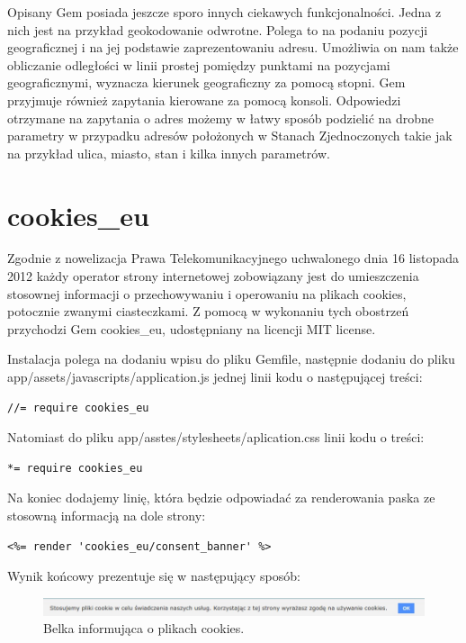 \documentclass[openright]{xmgr}
\begin{document}
Opisany Gem posiada jeszcze sporo innych ciekawych funkcjonalności. Jedna z nich jest na przykład geokodowanie odwrotne. Polega to na podaniu pozycji geograficznej i na jej podstawie zaprezentowaniu adresu. Umożliwia on nam także obliczanie odległości w linii prostej pomiędzy punktami na pozycjami geograficznymi, wyznacza kierunek geograficzny za pomocą stopni. Gem przyjmuje również zapytania kierowane za pomocą konsoli. Odpowiedzi otrzymane na zapytania o  adres możemy w łatwy sposób podzielić na drobne parametry w przypadku adresów położonych w Stanach Zjednoczonych takie jak na przykład ulica, miasto, stan i kilka innych parametrów.

\newpage

\section{cookies\_eu}
Zgodnie z nowelizacja Prawa Telekomunikacyjnego uchwalonego dnia 16 listopada 2012 każdy operator strony internetowej zobowiązany jest do umieszczenia stosownej informacji o przechowywaniu i operowaniu na plikach cookies, potocznie zwanymi ciasteczkami. Z pomocą w wykonaniu tych obostrzeń przychodzi Gem cookies\_eu\cite{cookies}, udostępniany na licencji MIT license.

Instalacja polega na dodaniu wpisu do pliku Gemfile, następnie dodaniu do pliku app/assets/javascripts/application.js jednej linii kodu o następującej treści:
\begin{lstlisting}[language=ruby2, caption={Kod odpowiadający dodanie bibliotek javascript}]
//= require cookies_eu
\end{lstlisting}
Natomiast do pliku app/asstes/stylesheets/aplication.css linii kodu o treści:
\begin{lstlisting}[language=ruby2, caption={Kod odpowiadający dodanie bibliotek kaskadowych arkuszy stylów}]
*= require cookies_eu
\end{lstlisting}
Na koniec dodajemy linię, która będzie odpowiadać za renderowania paska ze stosowną informacją na dole strony:
\begin{lstlisting}[language=ruby2, caption={Kod renderujący pasek z informacją o ciasteczkach}]
<%= render 'cookies_eu/consent_banner' %>
\end{lstlisting}

Wynik końcowy prezentuje się w następujący sposób:
\begin{figure}[!tbh]
\centering
\includegraphics[width=\linewidth]{fig/cookies}
\caption{Belka informująca o plikach cookies.}
\end{figure}
\end{document}
